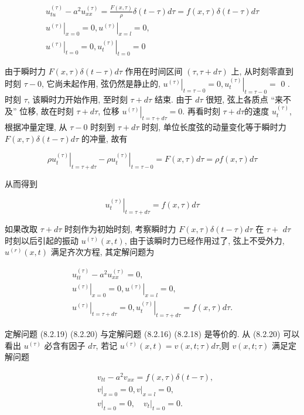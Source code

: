 $$
\begin{gathered}
u_{t u}^{(\tau)}-a^{2} u_{x x}^{(\tau)}=\frac{F(x, \tau)}{\rho} \delta(t-\tau) d \tau=f(x, \tau) \delta(t-\tau) d \tau \\
\left.u^{(\tau)}\right|_{x=0}=0,\left.u^{(\tau)}\right|_{x=l}=0, \\
\left.u^{(\tau)}\right|_{t=0}=0,\left.u_{t}^{(\tau)}\right|_{t=0}=0
\end{gathered}
$$

由于瞬时力 $F(x, \tau) \delta(t-\tau) d \tau$ 作用在时间区间 $(\tau, \tau+d \tau)$ 上, 从时刻零直到时刻 $\tau-0$, 它尚未起作用, 弦仍然是静止的, $\left.u^{(\tau)}\right|_{t=\tau-0}=0,\left.u_{t}^{(\tau)}\right|_{t=\tau-0}=$ 0 . 时刻 $\tau$, 该瞬时力开始作用, 至时刻 $\tau+d \tau$ 结束. 由于 $d \tau$ 很短, 弦上各质点 “来不及” 位移, 故在时刻 $\tau+d \tau$, 位移 $\left.u^{(\tau)}\right|_{t=\tau+d \tau}=0$. 再看时刻 $\tau+d \tau$的速度 $u_{t}^{(\tau)}$, 根据冲量定理, 从 $\tau-0$ 时刻到 $\tau+d \tau$ 时刻, 单位长度弦的动量变化等于瞬时力 $F(x, \tau) \delta(t-\tau) d \tau$ 的冲量, 故有

$$
\left.\rho u_{t}^{(\tau)}\right|_{t=\tau+d \tau}-\left.\rho u_{t}^{(\tau)}\right|_{t=\tau-0}=F(x, \tau) d \tau=\rho f(x, \tau) d \tau
$$

从而得到

$$
\left.u_{t}^{(\tau)}\right|_{t=\tau+d \tau}=f(x, \tau) d \tau
$$

如果改取 $\tau+d \tau$ 时刻作为初始时刻, 考察瞬时力 $F(x, \tau) \delta(t-\tau) d \tau$ 在 $\tau+$
$d \tau$ 时刻以后引起的振动 $u^{(\tau)}(x, t)$, 由于该瞬时力已经作用过了, 弦上不受外力, $u^{(r)}(x, t)$ 满足齐次方程, 其定解问题为

$$
\begin{gathered}
u_{t t}^{(\tau)}-a^{2} u_{x x}^{(\tau)}=0, \\
\left.u^{(\tau)}\right|_{x=0}=0,\left.u^{(\tau)}\right|_{x=l}=0, \\
\left.u^{(\tau)}\right|_{t=\tau+d \tau}=0,\left.u_{t}^{(\tau)}\right|_{t=\tau+d \tau}=f(x, \tau) d \tau .
\end{gathered}
$$

定解问题 (8.2.19) (8.2.20) 与定解问题 (8.2.16) (8.2.18) 是等价的. 从 (8.2.20) 可以看出 $u^{(\tau)}$ 必含有因子 $d \tau$, 若记 $u^{(\tau)}(x, t)=v(x, t ; \tau) d \tau$,则 $v(x, t ; \tau)$ 满足定解问题

$$
\begin{aligned}
& v_{t t}-a^{2} v_{x x}=f(x, \tau) \delta(t-\tau), \\
&\left.v\right|_{x=0}=0,\left.v\right|_{x=l}=0, \\
&\left.v\right|_{t=0}=0,\left.\quad v_{t}\right|_{t=0}=0 .
\end{aligned}
$$

